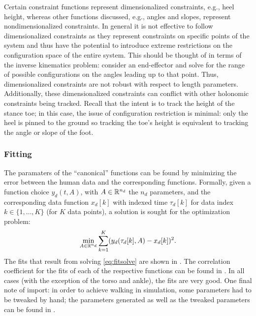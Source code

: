 \begin{remark} \label{rmk:dimconst}
  Certain constraint functions represent dimensionalized constraints, e.g., heel
  height, whereas other functions discussed, e.g., angles and slopes, represent
  nondimensionalized constraints.
  In general it is not effective to follow dimensionalized constraints as they
  represent constraints on specific points of the system and thus have the
  potential to introduce extreme restrictions on the configuration space of the
  entire system.
  This should be thought of in terms of the inverse kinematics problem:
  consider an end-effector and solve for the range of possible configurations on
  the angles leading up to that point.
  Thus, dimensionalized constraints are not robust with respect to length
  parameters.
  Additionally, these dimensionalized constraints can conflict with other
  holonomic constraints being tracked.
  Recall that the intent is to track the height of the stance toe;
  in this case, the issue of configuration restriction is minimal:
  only the heel is pinned to the ground so tracking the toe's height is
  equivalent to tracking the angle or slope of the foot.
\end{remark}


\subsubsection{Fitting}

The paramaters of the ``canonical'' functions can be found by minimizing the
error between the human data and the corresponding functions.
%
Formally, given a function choice $y_d(t, A)$, with $A \in \mathbb{R}^{n_{d}}$ the $n_d$
parameters, and the corresponding data function $x_{d}[k]$ with indexed time
$\tau_{d}[k]$ for data index $k \in \{1, \ldots, K\}$ (for $K$ data points), a
solution is sought for the optimization problem:
%
\begin{align}
  \label{eq:fitsolve}
  \min_{A \in \mathbb{R}^{n_{d}}} \sum_{k=1}^{K} (y_{d}(\tau_{d}[k], A) - x_{d}[k])^2.
\end{align}
%
The fits that result from solving \eqref{eq:fitsolve} are shown in
.
%
The correlation coefficient for the fits of each of the respective functions can
be found in .
%
In all cases (with the exception of the torso and ankle), the fits are very
good.
%
One final note of import:
%
in order to achieve walking in simulation, some parameters had to be tweaked by
hand;
%
the parameters generated as well as the tweaked parameters can be found in
.

